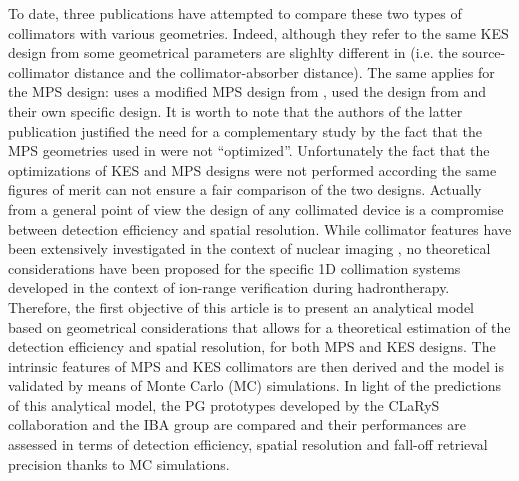 \documentclass[a4paper,english,12pt]{article}
\begin{document}
To date, three publications \citep{Smeets2016, Lin2017, Park2017} have attempted to compare these two types of collimators with various geometries. Indeed, although they refer to the same KES design from \citep{Perali2014} some geometrical parameters are slighlty different in \citep{Lin2017, Park2017} (i.e. the source-collimator distance and the collimator-absorber distance). The same applies for the MPS design: \cite{Smeets2016} uses a modified MPS design from \cite{Pinto2014a}, \cite{Lin2017} used the design from \cite{Gueth2013} and \cite{Park2017} their own specific design. It is worth to note that the authors of the latter publication justified the need for a complementary study by the fact that the MPS geometries used in \cite{Smeets2016, Lin2017} were not \enquote{optimized}. 
Unfortunately the fact that the optimizations of KES and MPS designs were not performed according the same figures of merit can not ensure a fair comparison of the two designs. Actually from a general point of view the design of any collimated device is a compromise between detection efficiency and spatial resolution. While collimator features have been extensively investigated in the context of nuclear imaging \citep{Gunter2004}, no theoretical considerations have been proposed for the specific 1D collimation systems developed in the context of ion-range verification during hadrontherapy.
Therefore, the first objective of this article is to present an analytical model based on geometrical considerations that allows for a theoretical estimation of the detection efficiency and spatial resolution, for both MPS and KES designs. The intrinsic features of MPS and KES collimators are then derived and the model is validated by means of Monte Carlo (MC) simulations. In light of the predictions of this analytical model, the PG prototypes developed by the CLaRyS collaboration \citep{Pinto2014a, Krimmer2015} and the IBA group \citep{Perali2014} are compared and their performances are assessed in terms of detection efficiency, spatial resolution and fall-off retrieval precision thanks to MC simulations.

\end{document}
